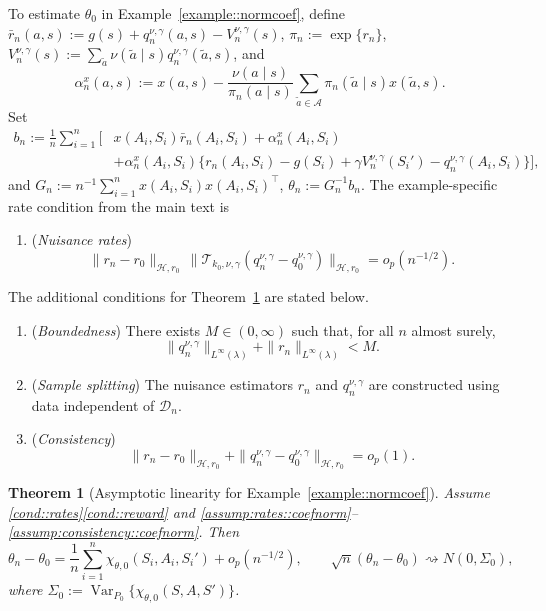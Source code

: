 \documentclass[11pt]{article}
\theoremstyle{plain}
\newtheorem{theorem}{Theorem}
\begin{document}
To estimate \(\theta_0\) in Example~\ref{example::normcoef}, define
\(\bar r_n(a,s):=g(s)+q_n^{\nu,\gamma}(a,s)-V_n^{\nu,\gamma}(s)\),
\(\pi_n:=\exp\{r_n\}\),
\(V_n^{\nu,\gamma}(s):=\sum_{\tilde a}\nu(\tilde a\mid s)
q_n^{\nu,\gamma}(\tilde a,s)\), and
\[
\alpha_n^x(a,s)
:=
x(a,s) - \frac{\nu(a\mid s)}{\pi_n(a\mid s)}
\sum_{\tilde a \in \mathcal A}\pi_n(\tilde a\mid s)x(\tilde a,s).
\]
Set
\[
\begin{aligned}
b_n
:=
\frac{1}{n}\sum_{i=1}^n \Big[
&x(A_i,S_i)\bar r_n(A_i,S_i)
+ \alpha_n^x(A_i,S_i) \\
&+ \alpha_n^x(A_i,S_i)\{r_n(A_i,S_i)-g(S_i)
+\gamma V_n^{\nu,\gamma}(S_i')
-q_n^{\nu,\gamma}(A_i,S_i)\}
\Big],
\end{aligned}
\]
and \(G_n:=n^{-1}\sum_{i=1}^n x(A_i,S_i)x(A_i,S_i)^\top\),
\(\theta_n:=G_n^{-1}b_n\). The example-specific rate condition from the main
text is
\begin{enumerate}[label=\textbf{(E\arabic****)}, ref=E\arabic****, series=efficiency3]
\item \label{assump:rates::coefnorm} (\textit{Nuisance rates})
\[
\|r_n-r_0\|_{\mathcal H,r_0}\,
\bigl\|\mathcal T_{k_0,\nu,\gamma}(q_n^{\nu,\gamma}-q_0^{\nu,\gamma})\bigr\|_{\mathcal H,r_0}
= o_p(n^{-1/2}).
\]
\end{enumerate}

The additional conditions for Theorem~\ref{theorem::ALex3} are stated below.
\begin{enumerate}[label=\textbf{(E\arabic****)}, ref=E\arabic****, resume = efficiency3]
    \item \label{assump:boundedness::coefnorm}(\textit{Boundedness})
    There exists $M \in (0,\infty)$ such that, for all $n$ almost surely,
    \[
      \|q_n^{\nu,\gamma}\|_{L^\infty(\lambda)}
      + \|r_n\|_{L^\infty(\lambda)}
      < M.
    \]

    \item \label{assump:splitting::coefnorm}(\textit{Sample splitting})
    The nuisance estimators $r_n$ and $q_n^{\nu,\gamma}$ are constructed using
    data independent of $\mathcal{D}_n$.

    \item \label{assump:consistency::coefnorm}(\textit{Consistency})
    \[
      \|r_n - r_0\|_{\mathcal{H},r_0}
      + \|q_n^{\nu,\gamma} - q_0^{\nu,\gamma}\|_{\mathcal{H},r_0}
      = o_p(1).
    \]
\end{enumerate}

\begin{theorem}[Asymptotic linearity for Example~\ref{example::normcoef}]
\label{theorem::ALex3}
Assume \ref{cond::rates}\ref{cond::reward} and
\ref{assump:rates::coefnorm}--\ref{assump:consistency::coefnorm}. Then
\[
\theta_n - \theta_0
= \frac{1}{n}\sum_{i=1}^n \chi_{\theta,0}(S_i,A_i,S_i') + o_p(n^{-1/2}),
\qquad
\sqrt n(\theta_n-\theta_0)\rightsquigarrow N(0,\Sigma_0),
\]
where \(\Sigma_0 := \operatorname{Var}_{P_0}\{\chi_{\theta,0}(S,A,S')\}\).
\end{theorem}
\end{document}
